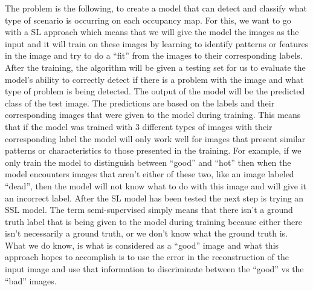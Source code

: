The problem is the following, to create a model that can detect and classify what type of scenario is occurring on each occupancy map. For this, we want to go with a SL approach which means that we will give the model the images as the input and it will train on these images by learning to identify patterns or features in the image and try to do a “fit” from the images to their corresponding labels. After the training, the algorithm will be given a testing set for us to evaluate the model’s ability to correctly detect if there is a problem with the image and what type of problem is being detected. The output of the model will be the predicted class of the test image. The predictions are based on the labels and their corresponding images that were given to the model during training. This means that if the model was trained with 3 different types of images with their corresponding label the model will only work well for images that present similar patterns or characteristics to those presented in the training. For example, if we only train the model to distinguish between “good” and “hot” then when the model encounters images that aren’t either of these two, like an image labeled “dead”, then the model will not know what to do with this image and will give it an incorrect label.
After the SL model has been tested the next step is trying an SSL model. The term semi-supervised simply means that there isn’t a ground truth label that is being given to the model during training because either there isn’t necessarily a ground truth, or we don’t know what the ground truth is. What we do know, is what is considered as a “good” image and what this approach hopes to accomplish is to use the error in the reconstruction of the input image and use that information to discriminate between the “good” vs the “bad” images.

